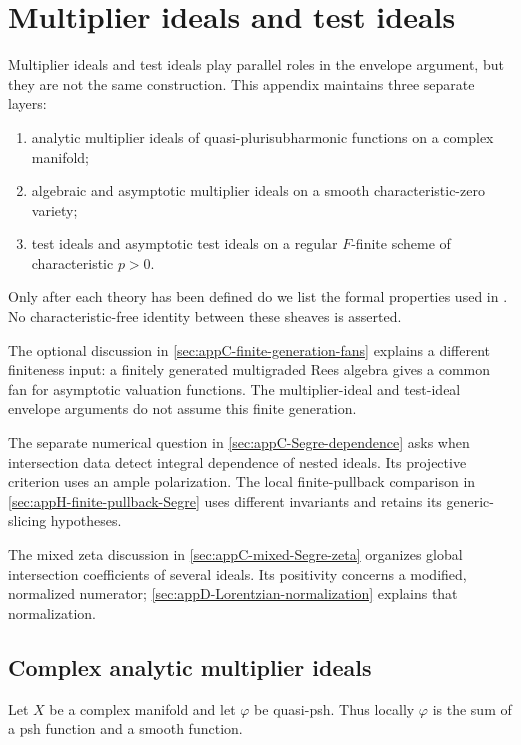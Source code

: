 \chapter{Multiplier ideals and test ideals}
\label{app:ideals}

Multiplier ideals and test ideals play parallel roles in the envelope
argument, but they are not the same construction.  This appendix maintains
three separate layers:
\begin{enumerate}
\item analytic multiplier ideals of quasi-plurisubharmonic functions on a
      complex manifold;
\item algebraic and asymptotic multiplier ideals on a smooth
      characteristic-zero variety;
\item test ideals and asymptotic test ideals on a regular \(F\)-finite
      scheme of characteristic \(p>0\).
\end{enumerate}
Only after each theory has been defined do we list the formal properties
used in .  No
characteristic-free identity between these sheaves is asserted.

The optional discussion in \cref{sec:appC-finite-generation-fans}
explains a different finiteness input: a finitely generated multigraded
Rees algebra gives a common fan for asymptotic valuation functions.
The multiplier-ideal and test-ideal envelope arguments do not assume
this finite generation.

The separate numerical question in \cref{sec:appC-Segre-dependence}
asks when intersection data detect integral dependence of nested ideals.
Its projective criterion uses an ample polarization. The local
finite-pullback comparison in \cref{sec:appH-finite-pullback-Segre}
uses different invariants and retains its generic-slicing hypotheses.

The mixed zeta discussion in \cref{sec:appC-mixed-Segre-zeta}
organizes global intersection coefficients of several ideals.
Its positivity concerns a modified, normalized numerator;
\cref{sec:appD-Lorentzian-normalization} explains that normalization.

\section{Complex analytic multiplier ideals}
\label{sec:appC-analytic-multiplier}

Let \(X\) be a complex manifold and let \(\varphi\) be quasi-psh.  Thus
locally \(\varphi\) is the sum of a psh function and a smooth function.

